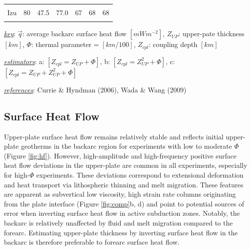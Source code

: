\begin{table}
\begin{threeparttable}
\begin{tabular}[t]{lrrrrrr}
\cellcolor{gray!6}{Kamchatka} & \cellcolor{gray!6}{70} & \cellcolor{gray!6}{80.2} & \cellcolor{gray!6}{77.0} & \cellcolor{gray!6}{89} & \cellcolor{gray!6}{88} & \cellcolor{gray!6}{88}\\
Izu & 80 & 47.5 & 77.0 & 67 & 68 & 68\\
\cellcolor{gray!6}{NE Japan} & \cellcolor{gray!6}{88} & \cellcolor{gray!6}{47.7} & \cellcolor{gray!6}{107.9} & \cellcolor{gray!6}{64} & \cellcolor{gray!6}{65} & \cellcolor{gray!6}{65}\\
\bottomrule
\end{tabular}
\begin{tablenotes}
\item \uline{\textit{key}}: $\vec{q}$: average backarc surface heat flow $[mWm^{-2}]$, $Z_{UP}$: upper-pate thickness $[km]$, $\Phi$: thermal parameter = $[km/100]$, $Z_{cpl}$: coupling depth $[km]$
\item \uline{\textit{estimators}}: a: $[Z_{cpl}=Z_{UP}+\Phi]$, b: $[Z_{cpl}=Z_{UP}^2+\Phi]$, c: $[Z_{cpl}=Z_{UP}+Z_{UP}^2+\Phi]$
\item \uline{\textit{references}}: Currie \& Hyndman (2006), Wada \& Wang (2009)
\end{tablenotes}
\end{threeparttable}
\end{table}

\hypertarget{surface-heat-flow}{%
\subsection{Surface Heat Flow}\label{surface-heat-flow}}

Upper-plate surface heat flow remains relatively stable and reflects initial upper-plate geotherms in the backarc region for experiments with low to moderate \(\Phi\) (Figure \ref{fig:hf}). However, high-amplitude and high-frequency positive surface heat flow deviations in the upper-plate are common in all experiments, especially for high-\(\Phi\) experiments. These deviations correspond to extensional deformation and heat transport via lithospheric thinning and melt migration. These features are apparent as subvertical low viscosity, high strain rate columns originating from the plate interface (Figure \ref{fig:comp}b, d) and point to potential sources of error when inverting surface heat flow in active subduction zones. Notably, the backarc is relatively unaffected by fluid and melt migration compared to the forearc. Estimating upper-plate thickness by inverting surface heat flow in the backarc is therefore preferable to forearc surface heat flow.

